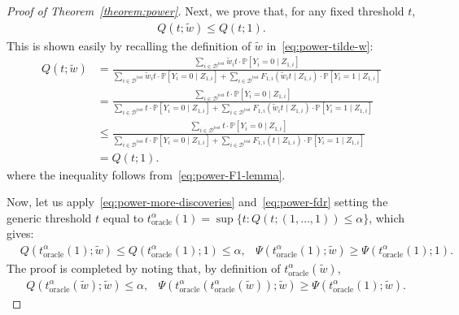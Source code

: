 \documentclass[11pt]{article}
\renewcommand{\P}[1]{\mathbb{P}\left[#1\right]}
\begin{document}
\begin{proof}[Proof of Theorem~\ref{theorem:power}]
Next, we prove that, for any fixed threshold $t$,
\begin{align} \label{eq:power-fdr}
  Q(t; \tilde{w}) \leq Q(t; 1).
\end{align}
This is shown easily by recalling the definition of $\tilde{w}$ in~\eqref{eq:power-tilde-w}:
\begin{align*}
  Q(t; \tilde{w})
  & = \frac{\sum_{i \in \mathcal{D}^{\mathrm{test}}} \tilde{w}_i t \cdot \P{Y_i = 0 \mid Z_{1,i}} }{ \sum_{i \in \mathcal{D}^{\mathrm{test}}} \tilde{w}_i t \cdot \P{Y_i = 0 \mid Z_{1,i}} + \sum_{i \in \mathcal{D}^{\mathrm{test}}} F_{1,i}(\tilde{w}_i t \mid Z_{1,i}) \cdot \P{Y_i = 1 \mid Z_{1,i}}} \\
  & = \frac{\sum_{i \in \mathcal{D}^{\mathrm{test}}} t \cdot \P{Y_i = 0 \mid Z_{1,i}} }{ \sum_{i \in \mathcal{D}^{\mathrm{test}}} t \cdot \P{Y_i = 0 \mid Z_{1,i}} + \sum_{i \in \mathcal{D}^{\mathrm{test}}} F_{1,i}(\tilde{w}_i t \mid Z_{1,i}) \cdot \P{Y_i = 1 \mid Z_{1,i}}} \\
  & \leq \frac{\sum_{i \in \mathcal{D}^{\mathrm{test}}} t \cdot \P{Y_i = 0 \mid Z_{1,i}} }{ \sum_{i \in \mathcal{D}^{\mathrm{test}}} t \cdot \P{Y_i = 0 \mid Z_{1,i}} + \sum_{i \in \mathcal{D}^{\mathrm{test}}} F_{1,i}(t \mid Z_{1,i}) \cdot \P{Y_i = 1 \mid Z_{1,i}}} \\
  & = Q(t; 1).
\end{align*}
where the inequality follows from~\eqref{eq:power-F1-lemma}.

Now, let us apply~\eqref{eq:power-more-discoveries} and~\eqref{eq:power-fdr} setting the generic threshold $t$ equal to $t^{\alpha}_{\mathrm{oracle}}(1) = \sup \{ t: Q(t; (1,\ldots,1)) \leq \alpha\}$, which gives:
\begin{align*}
  & Q(t^{\alpha}_{\mathrm{oracle}}(1); \tilde{w}) \leq Q(t^{\alpha}_{\mathrm{oracle}}(1); 1) \leq \alpha,
  & \Psi(t^{\alpha}_{\mathrm{oracle}}(1);\tilde{w}) \geq \Psi(t^{\alpha}_{\mathrm{oracle}}(1);1).
\end{align*}
The proof is completed by noting that, by definition of $t^{\alpha}_{\mathrm{oracle}}(\tilde{w})$,
\begin{align*}
  & Q(t^{\alpha}_{\mathrm{oracle}}(\tilde{w}); \tilde{w}) \leq \alpha,
  & \Psi(t^{\alpha}_{\mathrm{oracle}}(t^{\alpha}_{\mathrm{oracle}}(\tilde{w}));\tilde{w}) \geq \Psi(t^{\alpha}_{\mathrm{oracle}}(1);\tilde{w}).
\end{align*}

\end{proof}


\clearpage
\end{document}
